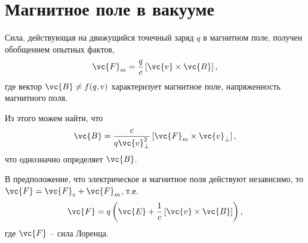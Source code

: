\section{Магнитное поле в вакууме}


\begin{to_law} 
    Сила, действующая на движущийся точечный заряд $q$ в магнитном поле, получен обобщением опытных фактов,
    \begin{equation}
         \vc{F}_m = \frac{q}{c} \left[\vc{v} \times \vc{B}\right],
     \end{equation} 
    где вектор $\vc{B} \neq f(q, v)$ характеризует магнитное поле, напряженность магнитного поля.
\end{to_law}

Из этого можем найти, что
$$
    \vc{B} = \frac{c}{q \vc{v}^2_{\bot}} \left[
        \vc{F}_m \times \vc{v}_{\bot}
    \right],
$$
что однозначно определяет $\vc{B}$.

В предположение, что электрическое и магнитное поля действуют независимо, то $\vc{F} = \vc{F}_e + \vc{F}_m$, т.е.
$$
    \vc{F} = q \left(
        \vc{E} + \frac{1}{c} \left[\vc{v} \times \vc{B}\right]
    \right),
$$
где $\vc{F}$ -- сила Лоренца.

